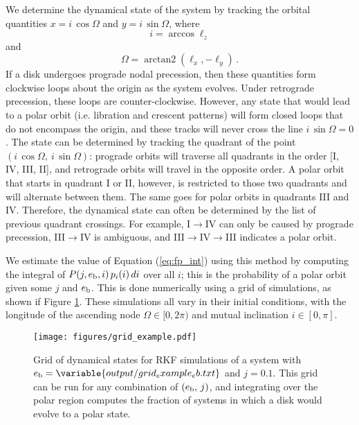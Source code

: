 \documentclass[twocolumn,linenumbers]{aastex631}
\DeclareMathOperator{\arctantwo}{arctan2}
\begin{document}
We determine the dynamical state of the system by tracking the orbital quantities $x=i\,\cos{\Omega}$ and $y=i\,\sin{\Omega}$, where
\begin{equation}
    i = \arccos{\ell_z}
    \label{eq:inclination}
\end{equation}
and
\begin{equation}
    \Omega = \arctantwo (\ell_x, -\ell_y)\, .
    \label{eq:omega}
\end{equation}
If a disk undergoes prograde nodal precession, then these quantities form clockwise loops about the origin as the system evolves. Under retrograde precession, these loops are counter-clockwise. However, any state that would lead to a polar orbit (i.e. libration and crescent patterns) will form closed loops that do not encompass the origin, and these tracks will never cross the line $i\,\sin{\Omega}=0$. The state can be determined by tracking the quadrant of the point $(i\,\cos{\Omega},~i\,\sin{\Omega})$: prograde orbits will traverse all quadrants in the order [I, IV, III, II], and retrograde orbits will travel in the opposite order. A polar orbit that starts in quadrant I or II, however, is restricted to those two quadrants and will alternate between them. The same goes for polar orbits in quadrants III and IV. Therefore, the dynamical state can often be determined by the list of previous quadrant crossings. For example, I$\rightarrow$IV can only be caused by prograde precession, III$\rightarrow$IV is ambiguous, and III$\rightarrow$IV$\rightarrow$III indicates a polar orbit.

We estimate the value of Equation (\ref{eq:fp_int}) using this method by computing the integral of $P(j,e_{\rm b},i)\,p_i(i)\,di$ over all $i$; this is the probability of a polar orbit given some $j$ and $e_{\rm b}$. This is done numerically using a grid of simulations, as shown if Figure \ref{fig:grid_example}. These simulations all vary in their initial conditions, with the longitude of the ascending node $\Omega \in [0,2\pi)$ and mutual inclination $i \in [0,\pi]$.

\begin{figure}
    \begin{centering}
        \texttt{[image: figures/grid\_example.pdf]}
    \end{centering}
    \caption{
        Grid of dynamical states for  RKF simulations of a system with $e_{\rm b}=\variable{output/grid_example_eb.txt}$ and $j=0.1$. This grid can be run for any combination of $(e_{\rm b},\,j)$, and integrating over the polar region computes the fraction of systems in which a disk would evolve to a polar state.
    }
    \label{fig:grid_example}
\end{figure}
\end{document}

